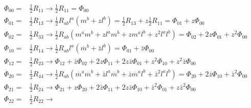 \begin{align*}
    \Phi_{00}=& \frac{1}{2} R_{11} \to \frac{1}{2}R_{11}= \Phi_{00} \\
    \Phi_{01}=& \frac{1}{2} R_{13} \to \frac{1}{2}R_{ab}l^a (m^b + z l^b)
    =\frac{1}{2}R_{13} + z\frac{1}{2}R_{11} = \Phi_{01} + z \Phi_{00} \\
    \Phi_{02}=& \frac{1}{2} R_{33} \to %
    \frac{1}{2}R_{ab}(m^am^b + z l^am^b+ zm^al^b + z^2 l^al^b) 
    =\Phi_{02}+ 2z\Phi_{01} + z^2 \Phi_{00} \\
    \Phi_{10}=& \frac{1}{2} R_{14} \to \frac{1}{2}R_{ab}l^a(\overline{m}^b + \bar{z} l^b)
    = \Phi_{01} + \bar{z} \Phi_{00} \\
    \Phi_{12}=& \frac{1}{2} R_{23} \to %
    \Phi_{12}+\bar{z}\Phi_{02}+2z\Phi_{11} +2z\bar{z}\Phi_{01}
    +z^2 \Phi_{10} + z^2\bar{z} \Phi_{00} \\
    \Phi_{20}=& \frac{1}{2} R_{44} \to \frac{1}{2}R_{ab}
    (\overline{m}^a\overline{m}^b + \bar{z} l^a\overline{m}^b
    +\bar{z}\overline{m}^al^b + \bar{z}^2 l^al^b)
    =\Phi_{20}+ 2\bar{z}\Phi_{10} + \bar{z}^2 \Phi_{00} \\
    \Phi_{21}=& \frac{1}{2} R_{24} \to  %
    \Phi_{21}+ {z}\Phi_{20}+2\bar{z}\Phi_{11}
    +2z\bar{z}\Phi_{10} +\bar{z}^2 \Phi_{01} + z\bar{z}^2 \Phi_{00}\\
    \Phi_{22}=& \frac{1}{2} R_{22} \to %

\end{align*}
